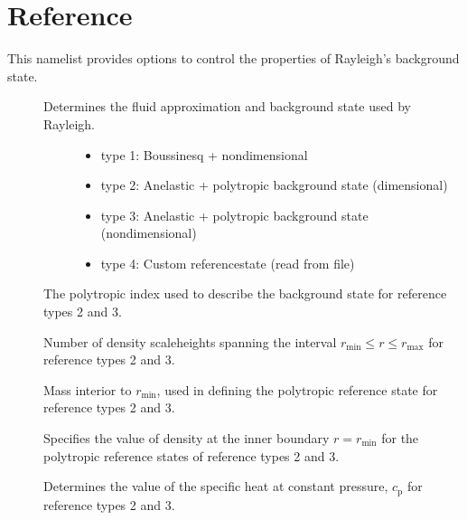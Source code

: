 \documentclass[letterpaper,11pt,english]{sphinxmanual}
\begin{document}
\section{Reference}
\label{\detokenize{doc/source/Namelist_Definitions/Namelist_Variables:reference}}
\sphinxAtStartPar
This namelist provides options to control the properties of Rayleigh’s background state.
\begin{description}
\item[{}] \leavevmode\begin{description}
\item[{Determines the fluid approximation and background state used by Rayleigh.}] \leavevmode\begin{itemize}
\item {} 
\sphinxAtStartPar
type 1:  Boussinesq + nondimensional

\item {} 
\sphinxAtStartPar
type 2:  Anelastic + polytropic background state (dimensional)

\item {} 
\sphinxAtStartPar
type 3:  Anelastic + polytropic background state (non\sphinxhyphen{}dimensional)

\item {} 
\sphinxAtStartPar
type 4:  Custom reference\sphinxhyphen{}state (read from file)

\end{itemize}

\end{description}

\item[{}] \leavevmode
\sphinxAtStartPar
The polytropic index used to describe the background state for reference types 2 and 3.

\item[{}] \leavevmode
\sphinxAtStartPar
Number of density scaleheights spanning the interval \(r_\mathrm{min}\le r\le r_\mathrm{max}\) for reference types 2 and 3.

\item[{}] \leavevmode
\sphinxAtStartPar
Mass interior to \(r_\mathrm{min}\), used in defining the polytropic reference state for reference types 2 and 3.

\item[{}] \leavevmode
\sphinxAtStartPar
Specifies the value of density at the inner boundary \(r=r_\mathrm{min}\) for the polytropic reference states of reference types 2 and 3.

\item[{}] \leavevmode
\sphinxAtStartPar
Determines the value of the specific heat at constant pressure, \(c_\mathrm{p}\) for reference types 2 and 3.

\end{description}
\end{document}
